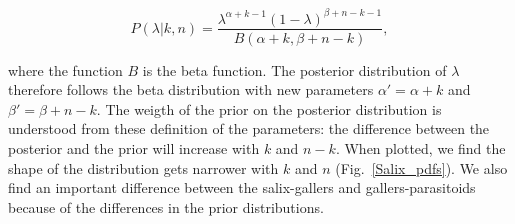 \documentclass[12pt]{article}
\begin{document}
      \begin{equation}
        P(\lambda|k,n) = \frac{\lambda^{\alpha+k-1}(1-\lambda)^{\beta+n-k-1}}{B(\alpha+k,\beta+n-k)} , \label{posterior}
      \end{equation}

      


      \noindent where the function $B$ is the beta function. The posterior distribution of $\lambda$ therefore follows the beta distribution with new parameters $\alpha'= \alpha+k$ and $\beta'=\beta+n-k$. The weigth of the prior on the posterior distribution is understood from these definition of the parameters: the difference between the posterior and the prior will increase with $k$ and $n-k$. When plotted, we find the shape of the distribution gets narrower with $k$ and $n$ (Fig.~\ref{Salix_pdfs}). We also find an important difference between the salix-gallers and gallers-parasitoids because of the differences in the prior distributions. 


\end{document}
